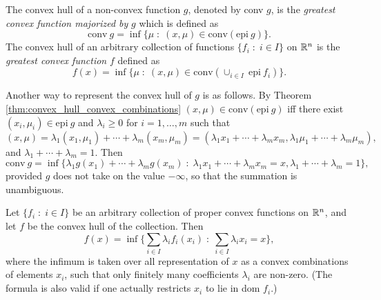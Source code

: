 \documentclass[11pt,a4paper]{article}
\begin{document}
\begin{definition}
    The {convex hull} of a non-convex function $g$, denoted by conv $g$, is the \textit{greatest convex function majorized by} $g$ which is defined as 
    \begin{equation*}
        \mathrm{conv}\ g = \inf \{\mu\;:\;(x,\mu)\in \mathrm{conv}(\mathrm{epi}\ g)\}.
    \end{equation*}
    The convex hull of an arbitrary collection of functions $\{f_i\;:\;i\in I\}$ on $\mathbb{R}^n$ is the \textit{greatest convex function} $f$ defined as 
    \begin{equation*}
        f(x) = \inf \{\mu\;:\;(x,\mu)\in \mathrm{conv}(\cup_{i\in I}\ \mathrm{epi}\ f_i)\}.
    \end{equation*}
\end{definition}

\begin{remark}
    Another way to represent the convex hull of $g$ is as follows. By Theorem \ref{thm:convex_hull_convex_combinations} $(x,\mu)\in \mathrm{conv}(\mathrm{epi}\ g)$ iff there exist $(x_i,\mu_i)\in \mathrm{epi}\ g$ and $\lambda_i\ge 0$ for $i = 1,\ldots,m$ such that 
    \begin{equation*}
        (x,\mu) = \lambda_1 (x_1,\mu_1) + \cdots + \lambda_m (x_m,\mu_m) = (\lambda_1 x_1 + \cdots + \lambda_m x_m,\lambda_1\mu_1+\cdots+\lambda_m\mu_m),
    \end{equation*}
    and $\lambda_1+\cdots+\lambda_m = 1$. Then
    \begin{equation*}
        \mathrm{conv}\ g = \inf\{\lambda_1g(x_1)+\cdots+\lambda_mg(x_m)\;:\; \lambda_1x_1+\cdots+\lambda_mx_m = x, \lambda_1+\cdots+\lambda_m = 1\},
    \end{equation*}
    provided $g$ does not take on the value $-\infty$, so that the summation is unambiguous.
\end{remark}

\begin{theorem}
    Let $\{f_i\;:\;i\in I\}$ be an arbitrary collection of proper convex functions on $\mathbb{R}^n$, and let $f$ be the convex hull of the collection. Then
    \begin{equation*}
        f(x) = \inf\bigg\{\sum_{i\in I} \lambda_i f_i(x_i)\;:\;\sum_{i\in I}\lambda_i x_i = x\bigg\},
    \end{equation*}
    where the infimum is taken over all representation of $x$ as a convex combinations of elements $x_i$, such that only finitely many coefficients $\lambda_i$ are non-zero. (The formula is also valid if one actually restricts $x_i$ to lie in dom $f_i$.)
\end{theorem}
\end{document}
